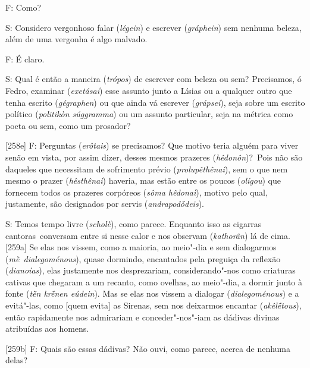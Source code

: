  

F: Como?

 

S: Considero vergonhoso falar (\emph{légein}) e escrever
(\emph{gráphein}) sem nenhuma beleza, além de uma vergonha é algo
malvado.

 

F: É claro.

 

S: Qual é então a maneira (\emph{trópos}) de escrever com beleza ou sem?
Precisamos, ó Fedro, examinar (\emph{exetásai}) esse assunto junto a
Lísias ou a qualquer outro que tenha escrito (\emph{gégraphen}) ou que
ainda vá escrever (\emph{grápsei}), seja sobre um escrito político
(\emph{politikòn súggramma}) ou um assunto particular, seja na métrica
como poeta ou sem, como um prosador?

 

[258e] F: Perguntas (\emph{erôtais}) se precisamos? Que motivo teria
alguém para viver senão em vista, por assim dizer, desses mesmos
prazeres (\emph{hêdonôn})?~Pois não são daqueles que necessitam de
sofrimento prévio (\emph{prolupêthênai}), sem o que nem mesmo o prazer
(\emph{hêsthênai}) haveria, mas estão entre os poucos (\emph{olígou})
que fornecem todos os prazeres corpóreos (\emph{sôma hêdonaì}), motivo
pelo qual, justamente, são designados por servis (\emph{andrapodṓdeis}).

 

S: Temos tempo livre (\emph{scholḕ}), como parece. Enquanto isso as
cigarras cantoras~conversam entre si nesse calor e nos observam
(\emph{kathorân}) lá de cima. [259a] Se elas nos vissem, como a
maioria, ao meio"-dia e sem dialogarmos (\emph{mḕ~dialegoménous}), quase
dormindo, encantados pela preguiça da reflexão (\emph{dianoías}), elas
justamente nos desprezariam, considerando"-nos como criaturas cativas que
chegaram a um recanto, como ovelhas, ao meio"-dia, a dormir junto à fonte
(\emph{tḕn krḗnen eúdein}). Mas se elas nos vissem a dialogar
(\emph{dialegoménous}) e a evitá"-las, como [quem evita] as Sirenas,
sem nos deixarmos encantar (\emph{akêlḗtous}), então rapidamente nos
admirariam e conceder"-nos"-iam as dádivas divinas atribuídas aos homens.

 

[259b] F: Quais são essas dádivas? Não ouvi, como parece, acerca de
nenhuma delas?

 

